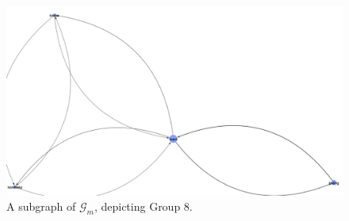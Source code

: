 \documentclass[11pt,a4paper]{book}
\theoremstyle{definition}
\theoremstyle{definition}
\theoremstyle{definition}
\theoremstyle{remark}
\newcommand{\acgraph}{\mathcal{G}_{m}}
\begin{document}
\begin{figure}
\includegraphics[width=\textwidth]{mgraph_group_8.png}
\caption{A subgraph of $\acgraph$, depicting Group 8.}
\label{fig:mgraph-community-8}
\end{figure}
%
%
%
%
%
%
%
%
%
%
%
%
%
%
%
%
%
\end{document}
